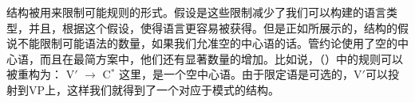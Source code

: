 \xbar 结构被用来限制可能规则的形式。假设是这些限制减少了我们可以构建的语言类型，并且，根据这个假设，使得语言更容易被获得。但是正如\citet{KP90a}所展示的，\xbar 结构的假说不能限制可能语法的数量，如果我们允准空的中心语的话。管约论使用了空的中心语，而且在最简方案\indexmp 中，他们还有显著数量的增加。比如说，（）中的规则可以被重构为：
\ea
V$'$ $\to$ \vnull C$^*$
\z
这里，\vnull 是一个空中心语。由于限定语是可选的，V$'$可以投射到VP上，这样我们就得到了一个对应于\xbar 模式的结构。

